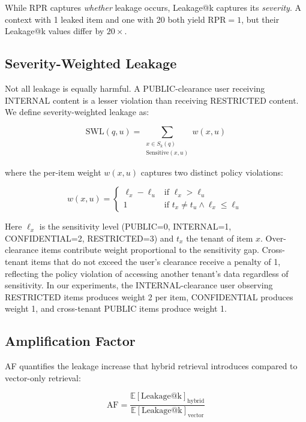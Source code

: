 \documentclass[letterpaper,twocolumn,10pt]{article}
\begin{document}
\noindent While RPR captures \emph{whether} leakage occurs,
Leakage@k captures its \emph{severity}. A context with 1 leaked item
and one with 20 both yield $\text{RPR} = 1$, but their Leakage@k
values differ by $20\times$.

\subsection{Severity-Weighted Leakage}

Not all leakage is equally harmful. A PUBLIC-clearance user receiving
INTERNAL content is a lesser violation than receiving RESTRICTED
content. We define severity-weighted leakage as:

\begin{equation}
\text{SWL}(q, u) = \sum_{\substack{x \in S_k(q) \\ \text{Sensitive}(x,u)}}
  w(x, u)
\label{eq:swl}
\end{equation}

\noindent where the per-item weight $w(x, u)$ captures two distinct
policy violations:

\begin{equation}
w(x, u) = \begin{cases}
  \ell_x - \ell_u & \text{if } \ell_x > \ell_u \\
  1 & \text{if } t_x \neq t_u \wedge \ell_x \leq \ell_u
\end{cases}
\label{eq:swl_weight}
\end{equation}

\noindent Here $\ell_x$ is the sensitivity level (PUBLIC=0,
INTERNAL=1, CONFIDENTIAL=2, RESTRICTED=3) and $t_x$ the tenant of
item $x$. Over-clearance items contribute weight proportional to the
sensitivity gap. Cross-tenant items that do not exceed the user's
clearance receive a penalty of 1, reflecting the policy violation of
accessing another tenant's data regardless of sensitivity. In our
experiments, the INTERNAL-clearance user observing RESTRICTED items
produces weight 2 per item, CONFIDENTIAL produces weight 1, and
cross-tenant PUBLIC items produce weight 1.

\subsection{Amplification Factor}

AF quantifies the leakage increase that hybrid retrieval introduces
compared to vector-only retrieval:

\begin{equation}
\text{AF} = \frac{\mathbb{E}[\text{Leakage@k}]_{\text{hybrid}}}%
  {\mathbb{E}[\text{Leakage@k}]_{\text{vector}}}
\label{eq:af}
\end{equation}
\end{document}
